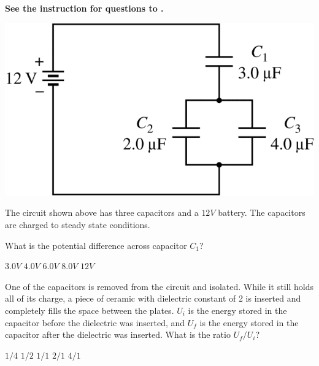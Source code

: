 
\textbf{See the instruction for questions  to .} 

\begin{center}
    \includegraphics[scale=0.3]{images/img-010-013.png}
\end{center}

The circuit shown above has three capacitors and a $12 \unit{V}$ battery. The capacitors are charged to steady state conditions.

\begin{questions}
\setcounter{question}{21}

\question
What is the potential difference across capacitor $C_{1}$?

\begin{oneparchoices}
    \choice $3.0 \unit{V}$
    \choice $4.0 \unit{V}$
    \choice $6.0 \unit{V}$
    \choice $8.0 \unit{V}$
    \choice $12 \unit{V}$
\end{oneparchoices}

\question
One of the capacitors is removed from the circuit and isolated. While it still holds all of its charge, a piece of ceramic with dielectric constant of 2 is inserted and completely fills the space between the plates. $U_{i}$ is the energy stored in the capacitor before the dielectric was inserted, and $U_{f}$ is the energy stored in the capacitor after the dielectric was inserted. What is the ratio $U_{f}/U_{i}$?

\begin{oneparchoices}
    \choice $1/4$
    \choice $1/2$
    \choice $1/1$
    \choice $2/1$
    \choice $4/1$
\end{oneparchoices}

\end{questions}
